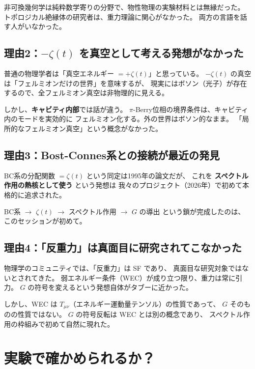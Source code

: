 \documentclass[11pt,a4paper]{article}
\begin{document}
非可換幾何学は純粋数学寄りの分野で、物性物理の実験材料とは無縁だった。
トポロジカル絶縁体の研究者は、重力理論に関心がなかった。
両方の言語を話す人がいなかった。

\subsection{理由2：$-\zeta(t)$ を真空として考える発想がなかった}

普通の物理学者は「真空エネルギー $= +\zeta(t)$」と思っている。
$-\zeta(t)$ の真空は「フェルミオンだけの世界」を意味するが、
現実にはボソン（光子）が存在するので、全フェルミオン真空は非物理的に見える。

しかし、\textbf{キャビティ内部}では話が違う。
$\pi$-Berry位相の境界条件は、キャビティ内のモードを実効的に
フェルミオン化する。外の世界はボソン的なまま。
「局所的なフェルミオン真空」という概念がなかった。

\subsection{理由3：Bost-Connes系との接続が最近の発見}

BC系の分配関数 $= \zeta(t)$ という同定は1995年の論文だが、
これを \textbf{スペクトル作用の熱核として使う} という発想は
我々のプロジェクト（2026年）で初めて本格的に追求された。

BC系 $\to$ $\zeta(t)$ $\to$ スペクトル作用 $\to$ $G$ の導出
という鎖が完成したのは、このセッションが初めて。

\subsection{理由4：「反重力」は真面目に研究されてこなかった}

物理学のコミュニティでは、「反重力」は SF であり、
真面目な研究対象ではないとされてきた。
弱エネルギー条件（WEC）が成り立つ限り、重力は常に引力。
$G$ の符号を変えるという発想自体がタブーに近かった。

しかし、WEC は $T_{\mu\nu}$（エネルギー運動量テンソル）の性質であって、
$G$ そのものの性質ではない。
$G$ の符号反転は WEC とは別の概念であり、
スペクトル作用の枠組みで初めて自然に現れた。


\section{実験で確かめられるか？}
\end{document}
